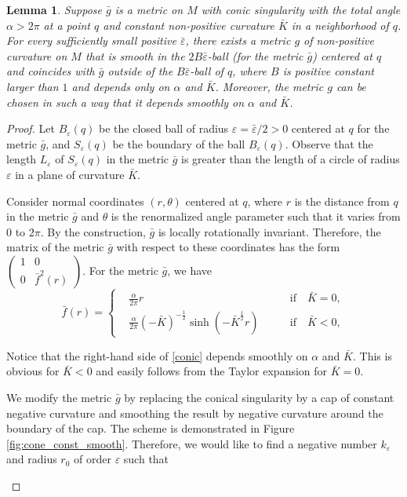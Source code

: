 \documentclass[12pt]{article}
\numberwithin{equation}{section}
\newtheorem{lem}{Lemma}[section]
\theoremstyle{definition}
\newcommand{\eps}{\varepsilon}
\begin{document}
\begin{lem}\label{lem:smooth_conical}
Suppose $\bar g$ is a metric on $M$ with conic singularity with the total angle  $\alpha>2\pi$ at a point $q$ and constant non-positive curvature $\bar K$ in a neighborhood of $q$. For every sufficiently small positive $\bar\eps$, there exists a metric $g$ of non-positive curvature on $M$ that is smooth in the $2B\bar\eps$-ball (for the metric $\bar g$) centered at  $q$ and coincides with $\bar g$ outside of the $B\bar\eps$-ball of $q$, where $B$ is positive constant larger than $1$ and depends only on $\alpha$ and  $\bar K$. Moreover, the metric $g$ can be chosen in such a way that it depends smoothly on  $\alpha$ and $\bar K$.
\end{lem}

\begin{proof}
Let $B_{\eps}(q)$ be the closed ball of radius $\eps=\bar\eps/2>0$ centered at $q$ for the metric $\bar g$, and $S_{\eps}(q)$ be the boundary of the ball $B_{\eps}(q)$. Observe that the length $L_\eps$ of $S_{\eps}(q)$ in the metric $\bar g$ is greater than the length of a circle of radius $\eps$ in a plane of curvature $\bar K$. 

Consider normal coordinates $(r,\theta)$ centered at $q$, where $r$ is the distance from $q$ in the metric $\bar g$ and $\theta$ is the renormalized angle parameter such that it varies from $0$ to $2\pi$. By the construction, $\bar g$ is locally rotationally invariant. Therefore, the matrix of the metric $\bar g$ with respect to these coordinates has the form $\left(\begin{array}{cc} 1 & 0\\ 0 & \bar f^2(r)\end{array}\right)$.  For the metric $\bar g$, we have
\begin{equation}\label{conic}
\bar f(r)=\left\{
  \begin{aligned}
&\frac{\alpha}{2\pi}r \qquad &\text{if} \quad \bar K=0,\\ 
&\frac{\alpha}{2\pi}\left(-\bar K\right)^{-\frac{1}{2}}\sinh({-\bar K}^{\frac{1}{2}}r)\qquad &\text{if} \quad \bar K<0,
\end{aligned}
\right.
\end{equation}

Notice that the right-hand side of \eqref{conic} depends smoothly on $\alpha$ and $\bar K$. This is obvious for $\bar K<0$ and   easily follows from  the Taylor expansion for $\bar K=0$.

We  modify the metric $\bar g$ by replacing the conical singularity by a cap of constant negative curvature and smoothing the result by negative curvature around the boundary of the cap. The scheme is demonstrated in Figure \ref{fig:cone_const_smooth}. Therefore, we would like to find a negative number $k_\eps$ and radius $r_0$ of order $\eps$ such that  
\begin{itemize}


\end{itemize}
\end{proof}
\end{document}

